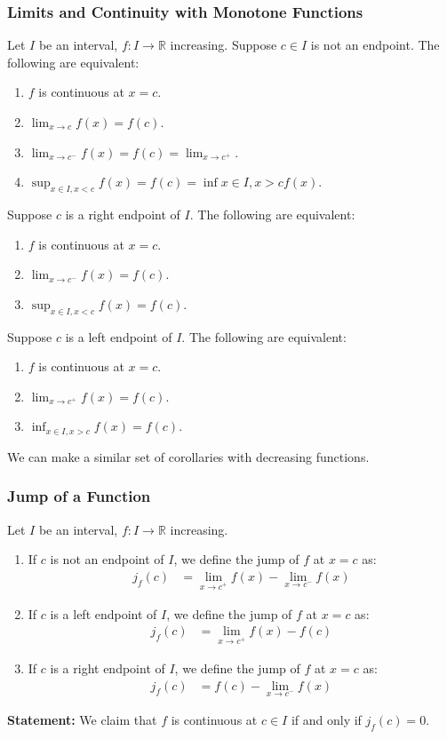 \documentclass[10pt]{extarticle}
\newcommand{\R}{\mathbb{R}}
\begin{document}
    \subsubsection{Limits and Continuity with Monotone Functions}%
    Let $I$ be an interval, $f: I\rightarrow \R$ increasing. Suppose $c\in I$ is not an endpoint. The following are equivalent:
    \begin{enumerate}[(1)]
      \item $f$ is continuous at $x=c$.
      \item $\lim_{x\rightarrow c}f(x) = f(c)$.
      \item $\lim_{x\rightarrow c^-}f(x) = f(c) = \lim_{x\rightarrow c^{+}}$.
      \item $\sup_{x\in I,x < c} f(x) = f(c) = \inf{x\in I, x > c}f(x)$.
    \end{enumerate}
    Suppose $c$ is a right endpoint of $I$. The following are equivalent:
    \begin{enumerate}[(1)]
      \item $f$ is continuous at $x=c$.
      \item $\lim_{x\rightarrow c^{-}}f(x) = f(c)$.
      \item $\sup_{x\in I, x < c}f(x) = f(c)$.
    \end{enumerate}
    Suppose $c$ is a left endpoint of $I$. The following are equivalent:
    \begin{enumerate}[(1)]
      \item $f$ is continuous at $x=c$.
      \item $\lim_{x\rightarrow c^{+}}f(x) = f(c)$.
      \item $\inf_{x\in I, x > c}f(x) = f(c)$.
    \end{enumerate}
    We can make a similar set of corollaries with decreasing functions.
    \subsubsection{Jump of a Function}%
    Let $I$ be an interval, $f: I\rightarrow \R$ increasing.
    \begin{enumerate}[(1)]
      \item If $c$ is not an endpoint of $I$, we define the jump of $f$ at $x=c$ as:
        \begin{align*}
          j_f(c) &= \lim_{x\rightarrow c^{+}}f(x) - \lim_{x\rightarrow c^{-}}f(x)
        \end{align*}
      \item If $c$ is a left endpoint of $I$, we define the jump of $f$ at $x=c$ as:
        \begin{align*}
          j_{f}(c) &= \lim_{x\rightarrow c^{+}}f(x) - f(c)
        \end{align*}
      \item If $c$ is a right endpoint of $I$, we define the jump of $f$ at $x=c$ as:
        \begin{align*}
          j_f(c) &= f(c) - \lim_{x\rightarrow c^{-}}f(x)
        \end{align*}
    \end{enumerate}
    \textbf{Statement:} We claim that $f$ is continuous at $c\in I$ if and only if $j_f(c) = 0$.\\
\end{document}
